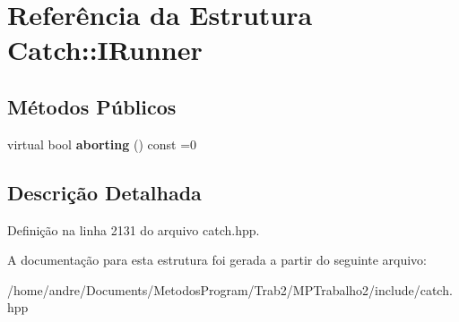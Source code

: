 \hypertarget{structCatch_1_1IRunner}{}\section{Referência da Estrutura Catch\+:\+:I\+Runner}
\label{structCatch_1_1IRunner}
\subsection*{Métodos Públicos}
\begin{DoxyCompactItemize}
\item 
virtual bool {\bfseries aborting} () const =0\hypertarget{structCatch_1_1IRunner_a03713202dd2e041e30b8030088ab0116}{}\label{structCatch_1_1IRunner_a03713202dd2e041e30b8030088ab0116}

\end{DoxyCompactItemize}


\subsection{Descrição Detalhada}


Definição na linha 2131 do arquivo catch.\+hpp.



A documentação para esta estrutura foi gerada a partir do seguinte arquivo\+:\begin{DoxyCompactItemize}
\item 
/home/andre/\+Documents/\+Metodos\+Program/\+Trab2/\+M\+P\+Trabalho2/include/catch.\+hpp\end{DoxyCompactItemize}
